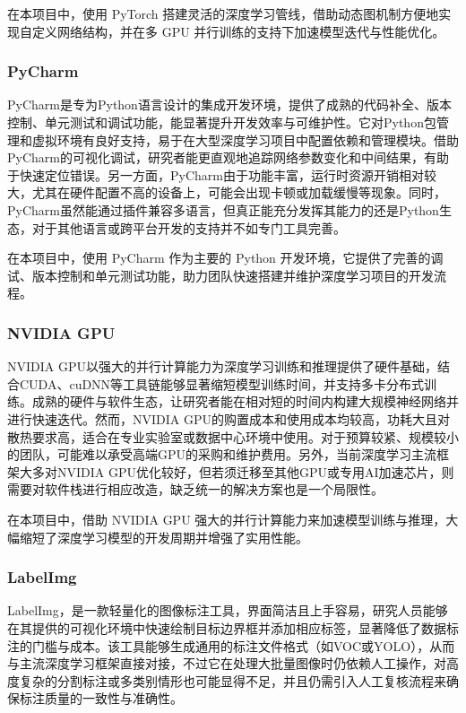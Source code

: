 在本项目中，使用 PyTorch 搭建灵活的深度学习管线，借助动态图机制方便地实现自定义网络结构，并在多 GPU 并行训练的支持下加速模型迭代与性能优化。

\subsubsection{PyCharm}
PyCharm是专为Python语言设计的集成开发环境，提供了成熟的代码补全、版本控制、单元测试和调试功能，能显著提升开发效率与可维护性。它对Python包管理和虚拟环境有良好支持，易于在大型深度学习项目中配置依赖和管理模块。借助PyCharm的可视化调试，研究者能更直观地追踪网络参数变化和中间结果，有助于快速定位错误。另一方面，PyCharm由于功能丰富，运行时资源开销相对较大，尤其在硬件配置不高的设备上，可能会出现卡顿或加载缓慢等现象。同时，PyCharm虽然能通过插件兼容多语言，但真正能充分发挥其能力的还是Python生态，对于其他语言或跨平台开发的支持并不如专门工具完善。

在本项目中，使用 PyCharm 作为主要的 Python 开发环境，它提供了完善的调试、版本控制和单元测试功能，助力团队快速搭建并维护深度学习项目的开发流程。

\subsubsection{NVIDIA GPU}
NVIDIA GPU以强大的并行计算能力为深度学习训练和推理提供了硬件基础，结合CUDA、cuDNN等工具链能够显著缩短模型训练时间，并支持多卡分布式训练。成熟的硬件与软件生态，让研究者能在相对短的时间内构建大规模神经网络并进行快速迭代。然而，NVIDIA GPU的购置成本和使用成本均较高，功耗大且对散热要求高，适合在专业实验室或数据中心环境中使用。对于预算较紧、规模较小的团队，可能难以承受高端GPU的采购和维护费用。另外，当前深度学习主流框架大多对NVIDIA GPU优化较好，但若须迁移至其他GPU或专用AI加速芯片，则需要对软件栈进行相应改造，缺乏统一的解决方案也是一个局限性。

在本项目中，借助 NVIDIA GPU 强大的并行计算能力来加速模型训练与推理，大幅缩短了深度学习模型的开发周期并增强了实用性能。

\subsubsection{LabelImg}
LabelImg，是一款轻量化的图像标注工具，界面简洁且上手容易，研究人员能够在其提供的可视化环境中快速绘制目标边界框并添加相应标签，显著降低了数据标注的门槛与成本。该工具能够生成通用的标注文件格式（如VOC或YOLO），从而与主流深度学习框架直接对接，不过它在处理大批量图像时仍依赖人工操作，对高度复杂的分割标注或多类别情形也可能显得不足，并且仍需引入人工复核流程来确保标注质量的一致性与准确性。

